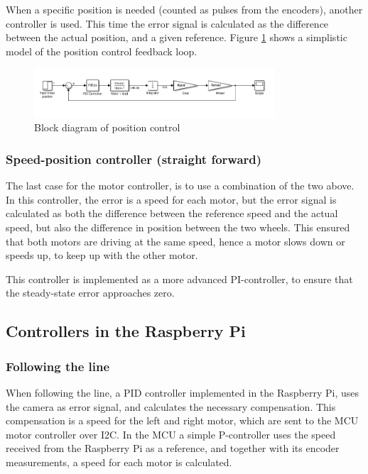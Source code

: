 When a specific position is needed (counted as pulses from the encoders), another controller is used. This time the error signal is calculated as the difference between the actual position, and a given reference. Figure \ref{fig:control_2} shows a simplistic model of the position control feedback loop.

\begin{figure}[!ht]
	\centering
	\includegraphics[width=0.8\textwidth]{resources/position_blockdiagram}
	\caption{Block diagram of position control}
	\label{fig:control_2}
\end{figure}

\subsubsection{Speed-position controller (straight forward)}

The last case for the motor controller, is to use a combination of the two above. In this controller, the error is a speed for each motor, but the error signal is calculated as both the difference between the reference speed and the actual speed, but also the difference in position between the two wheels. This ensured that both motors are driving at the same speed, hence a motor slows down or speeds up, to keep up with the other motor.

This controller is implemented as a more advanced PI-controller, to ensure that the steady-state error approaches zero. 

%
%
%
%
\subsection{Controllers in the Raspberry Pi}

\subsubsection{Following the line}
When following the line, a PID controller implemented in the Raspberry Pi, uses the camera as error signal, and calculates the necessary compensation. This compensation is a speed for the left and right motor, which are sent to the MCU motor controller over I2C. In the MCU a simple P-controller uses the speed received from the Raspberry Pi as 
a reference, and together with its encoder measurements, a speed for each motor is calculated.


